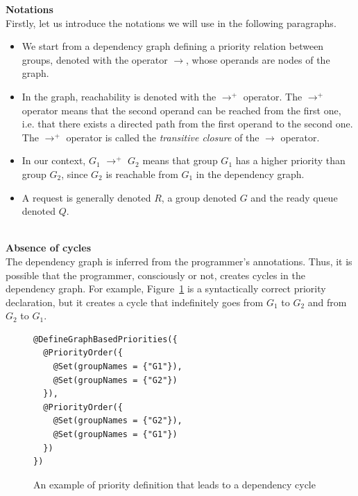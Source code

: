 \documentclass[11pt]{report}
\begin{document}
\textbf{Notations}\\
Firstly, let us introduce the notations we will use in the following paragraphs. 
\begin{itemize}
\item We start from a dependency graph defining a priority relation between groups, denoted with the operator $\longrightarrow$, whose operands are nodes of the graph.
\item In the graph, reachability is denoted with the $\longrightarrow^{+}$ operator. The $\longrightarrow^{+}$ operator means that the second operand can be reached from the first one, i.e. that there exists a directed path from the first operand to the second one. The $\longrightarrow^{+}$ operator is called the \emph{transitive closure} of the $\longrightarrow$ operator.
\item In our context, $G_1$ $\longrightarrow^{+}$ $G_2$ means that group $G_1$ has a higher priority than group $G_2$, since $G_2$ is reachable from $G_1$ in the dependency graph.
\item A request is generally denoted $R$, a group denoted $G$ and the ready queue denoted $Q$.
\end{itemize}\\

\textbf{Absence of cycles}\\
The dependency graph is inferred from the programmer's annotations. Thus, it is possible that the programmer, consciously or not, creates cycles in the dependency graph. For example, Figure~\ref{fig:cycle} is a  syntactically correct priority declaration, but it creates a cycle that indefinitely goes from $G_1$ to $G_2$ and from $G_2$ to $G_1$.

\begin{figure}[!ht]
	\lstset{language=java, numbers=left, numberstyle=\tiny, stepnumber=1, numbersep=5pt, basicstyle=\footnotesize}
	\begin{lstlisting}[frame=single]
@DefineGraphBasedPriorities({
  @PriorityOrder({
    @Set(groupNames = {"G1"}),
    @Set(groupNames = {"G2"})
  }),
  @PriorityOrder({
    @Set(groupNames = {"G2"}),
    @Set(groupNames = {"G1"})
  })
})
 	\end{lstlisting}
\caption{An example of priority definition that leads to a dependency cycle}
\label{fig:cycle}
\end{figure}
\end{document}
